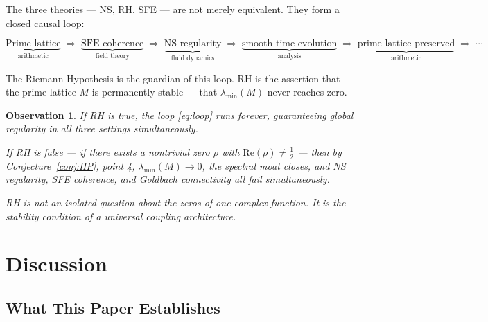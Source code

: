 \documentclass[12pt]{article}
\newtheorem{observation}[theorem]{Observation}
\begin{document}
The three theories --- NS, RH, SFE --- are not merely
equivalent. They form a closed causal loop:

\begin{equation}
\underbrace{\text{Prime lattice}}_{\text{arithmetic}}
\;\Rightarrow\;
\underbrace{\text{SFE coherence}}_{\text{field theory}}
\;\Rightarrow\;
\underbrace{\text{NS regularity}}_{\text{fluid dynamics}}
\;\Rightarrow\;
\underbrace{\text{smooth time evolution}}_{\text{analysis}}
\;\Rightarrow\;
\underbrace{\text{prime lattice preserved}}_{\text{arithmetic}}
\;\Rightarrow\; \cdots
\label{eq:loop}
\end{equation}

The Riemann Hypothesis is the guardian of this loop.
RH is the assertion that the prime lattice $M$ is permanently
stable --- that $\lambda_{\min}(M)$ never reaches zero.

\begin{observation}
If RH is true, the loop \eqref{eq:loop} runs forever,
guaranteeing global regularity in all three settings
simultaneously.

If RH is false --- if there exists a nontrivial zero
$\rho$ with $\mathrm{Re}(\rho) \neq \tfrac{1}{2}$ ---
then by Conjecture~\ref{conj:HP}, point 4,
$\lambda_{\min}(M) \to 0$, the spectral moat closes,
and NS regularity, SFE coherence, and Goldbach connectivity
all fail simultaneously.

RH is not an isolated question about the zeros of one
complex function. It is the stability condition of a
universal coupling architecture.
\end{observation}

\section{Discussion}

\subsection{What This Paper Establishes}
\end{document}
